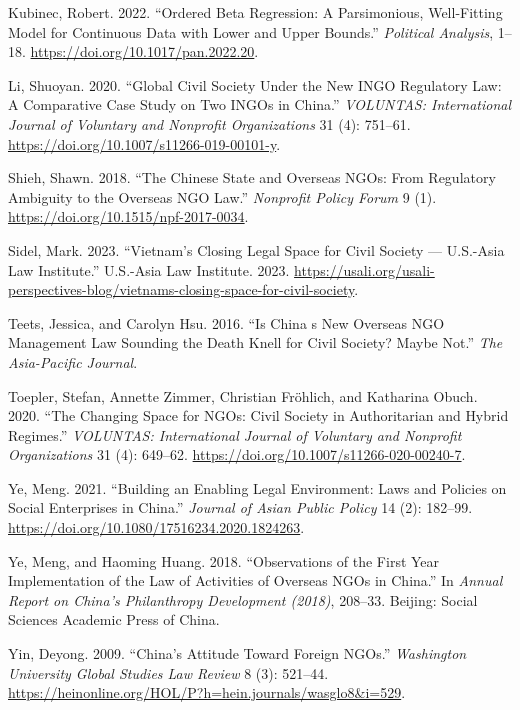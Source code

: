 \documentclass[
]{article}
\newlength{\cslhangindent}
\newlength{\cslentryspacingunit} %
\newenvironment{CSLReferences}[2] %
 {%
  \setlength{\parindent}{0pt}
  \ifodd #1
  \let\oldpar\par
  \def\par{\hangindent=\cslhangindent\oldpar}
  \fi
  \setlength{\parskip}{#2\cslentryspacingunit}
 }%
 {}
\begin{document}
\begin{CSLReferences}{1}{0}
\leavevmode{}%
Kubinec, Robert. 2022. {``Ordered {Beta Regression}: {A Parsimonious},
{Well-Fitting Model} for {Continuous Data} with {Lower} and {Upper
Bounds}.''} \emph{Political Analysis}, 1--18.
\url{https://doi.org/10.1017/pan.2022.20}.

\leavevmode{}%
Li, Shuoyan. 2020. {``Global {Civil Society Under} the {New INGO
Regulatory Law}: {A Comparative Case Study} on {Two INGOs} in
{China}.''} \emph{VOLUNTAS: International Journal of Voluntary and
Nonprofit Organizations} 31 (4): 751--61.
\url{https://doi.org/10.1007/s11266-019-00101-y}.

\leavevmode{}%
Shieh, Shawn. 2018. {``The {Chinese State} and {Overseas NGOs}: {From
Regulatory Ambiguity} to the {Overseas NGO Law}.''} \emph{Nonprofit
Policy Forum} 9 (1). \url{https://doi.org/10.1515/npf-2017-0034}.

\leavevmode{}%
Sidel, Mark. 2023. {``Vietnam's {Closing Legal Space} for {Civil
Society} --- {U}.{S}.-{Asia Law Institute}.''} {U.S.-Asia Law
Institute}. 2023.
\url{https://usali.org/usali-perspectives-blog/vietnams-closing-space-for-civil-society}.

\leavevmode{}%
Teets, Jessica, and Carolyn Hsu. 2016. {``Is {China} s {New Overseas NGO
Management Law Sounding} the {Death Knell} for {Civil Society}? {Maybe
Not}.''} \emph{The Asia-Pacific Journal}.

\leavevmode{}%
Toepler, Stefan, Annette Zimmer, Christian Fröhlich, and Katharina
Obuch. 2020. {``The {Changing Space} for {NGOs}: {Civil Society} in
{Authoritarian} and {Hybrid Regimes}.''} \emph{VOLUNTAS: International
Journal of Voluntary and Nonprofit Organizations} 31 (4): 649--62.
\url{https://doi.org/10.1007/s11266-020-00240-7}.

\leavevmode{}%
Ye, Meng. 2021. {``Building an Enabling Legal Environment: Laws and
Policies on Social Enterprises in {China}.''} \emph{Journal of Asian
Public Policy} 14 (2): 182--99.
\url{https://doi.org/10.1080/17516234.2020.1824263}.

\leavevmode{}%
Ye, Meng, and Haoming Huang. 2018. {``Observations of the First Year
Implementation of the Law of Activities of Overseas NGOs in China.''} In
\emph{Annual Report on China's Philanthropy Development (2018)},
208--33. {Beijing}: {Social Sciences Academic Press of China}.

\leavevmode{}%
Yin, Deyong. 2009. {``China's {Attitude} Toward {Foreign NGOs}.''}
\emph{Washington University Global Studies Law Review} 8 (3): 521--44.
\url{https://heinonline.org/HOL/P?h=hein.journals/wasglo8\&i=529}.

\end{CSLReferences}
\end{document}
